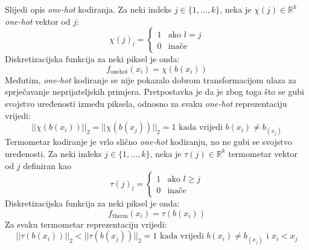 \documentclass[utf8, diplomski]{fer}
\begin{document}
Slijedi opis \textit{one-hot} kodiranja. Za neki indeks $j \in \{1, ..., k\}$, neka je $\chi(j) \in \mathbb{R}^{k}$ \textit{one-hot} vektor od $j$:
\begin{equation}
	\chi(j)_{l} = 
	\begin{cases}
      1 & \text{ako } l = j \\
      0 & \text{inače}
    \end{cases}     
\end{equation}
Diskretizacijska funkcija za neki piksel je onda:
\begin{equation}
	f_{\text{onehot}}(x_{i}) = \chi(b(x_{i}))
\end{equation}
Međutim, \textit{one-hot} kodiranje se nije pokazalo dobrom transformacijom ulaza za sprječavanje neprijateljskih primjera. Pretpostavka je da je zbog toga što se gubi svojstvo uređenosti između piksela, odnosno za svaku \textit{one-hot} reprezentaciju vrijedi:
\begin{equation}
	||\chi(b(x_{i}))||_{2} = ||\chi(b(x_{j}))||_{2} = 1 \text{ kada vrijedi } b(x_{i}) \neq b_(x_{j})
\end{equation}
Termometar kodiranje je vrlo slično \textit{one-hot} kodiranju, no ne gubi se svojstvo uređenosti. Za neki indeks $j \in \{1, ..., k\}$, neka je $\tau(j) \in \mathbb{R}^{k}$ termometar vektor od $j$ definiran kao
\begin{equation}
	\tau(j)_{l} = 
	\begin{cases}
      1 & \text{ako } l \geq j \\
      0 & \text{inače}
    \end{cases}     
\end{equation}
Diskretizacijska funkcija za neki piksel je onda:
\begin{equation}
	f_{\text{therm}}(x_{i}) = \tau(b(x_{i}))
\end{equation}
Za svaku termometar reprezentaciju vrijedi:
\begin{equation}
	||\tau(b(x_{i}))||_{2} < ||\tau(b(x_{j}))||_{2} = 1 \text{ kada vrijedi } b(x_{i}) \neq b_(x_{j}) \text{ i } x_{i} < x_{j}
\end{equation}
\end{document}
